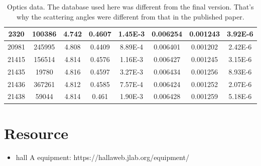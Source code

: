 \begin{table}
\begin{tabular}{c c | c c c | c c c}
	2320	& 100386    & 4.742 & 0.4607	& 1.45E-3    & 0.006254    & 0.001243    & 3.92E-6    \\
	\hline
	20981	& 245995    & 4.808 & 0.4409	& 8.89E-4    & 0.006401    & 0.001202    & 2.42E-6    \\
	21415	& 156514    & 4.814 & 0.4576	& 1.16E-3    & 0.006427    & 0.001245    & 3.15E-6    \\
	21435	& 19780	    & 4.816 & 0.4597	& 3.27E-3    & 0.006434    & 0.001256    & 8.93E-6    \\
	21436	& 367261    & 4.812 & 0.4585	& 7.57E-4    & 0.006424    & 0.001252    & 2.07E-6    \\
	21438	& 59044	    & 4.814 & 0.461	& 1.90E-3    & 0.006428    & 0.001259    & 5.18E-6    \\
	\hline
    \end{tabular}
    \caption{Optics data. The database used here was different from the final version.
    That's why the scattering angles were different from that in the published paper.}
\end{table}
\section{Resource}
\begin{itemize}
    \item hall A equipment: https://hallaweb.jlab.org/equipment/
\end{itemize}
